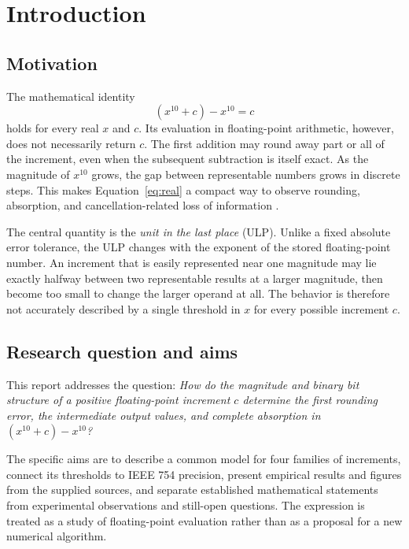 \chapter{Introduction}\label{ch:intro}

\section{Motivation}
The mathematical identity
\begin{equation}\label{eq:real}
 (x^{10}+c)-x^{10}=c
\end{equation}
holds for every real $x$ and $c$. Its evaluation in floating-point arithmetic, however, does not necessarily return $c$. The first addition may round away part or all of the increment, even when the subsequent subtraction is itself exact. As the magnitude of $x^{10}$ grows, the gap between representable numbers grows in discrete steps. This makes Equation~\eqref{eq:real} a compact way to observe rounding, absorption, and cancellation-related loss of information \cite{goldberg1991floating,higham2002accuracy}.

The central quantity is the \emph{unit in the last place} (ULP). Unlike a fixed absolute error tolerance, the ULP changes with the exponent of the stored floating-point number. An increment that is easily represented near one magnitude may lie exactly halfway between two representable results at a larger magnitude, then become too small to change the larger operand at all. The behavior is therefore not accurately described by a single threshold in $x$ for every possible increment $c$.

\section{Research question and aims}
This report addresses the question: \emph{How do the magnitude and binary bit structure of a positive floating-point increment $c$ determine the first rounding error, the intermediate output values, and complete absorption in $(x^{10}+c)-x^{10}$?}

The specific aims are to describe a common model for four families of increments, connect its thresholds to IEEE 754 precision, present empirical results and figures from the supplied sources, and separate established mathematical statements from experimental observations and still-open questions. The expression is treated as a study of floating-point evaluation rather than as a proposal for a new numerical algorithm.

